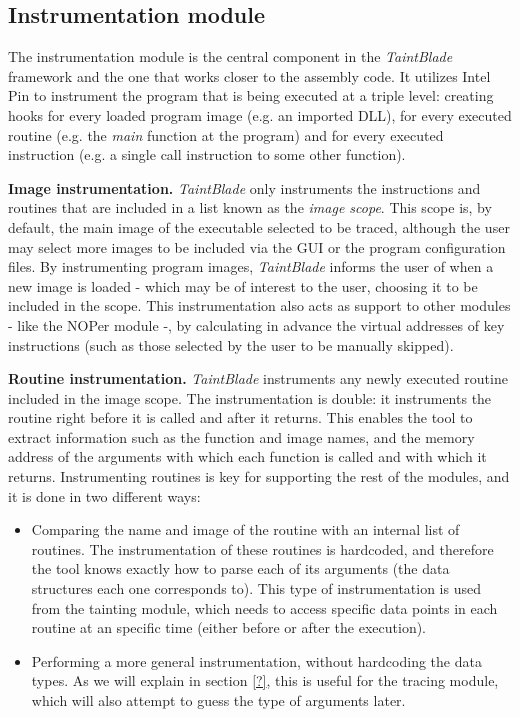 \documentclass[conference]{IEEEtran}
\begin{document}
\subsection{Instrumentation module}
The instrumentation module is the central component in the \textit{TaintBlade}
framework and the one that works closer to the assembly code. It utilizes Intel
Pin to instrument the program that is being executed at a triple level:
creating hooks for every loaded program image (e.g. an imported DLL), for every
executed routine (e.g. the \textit{main} function at the program) and for every
executed instruction (e.g. a single call instruction to some other function).

\textbf{Image instrumentation.}
\textit{TaintBlade} only instruments the instructions and routines that are included
in a list known as the \textit{image scope}. This scope is, by default, the main image of the executable
selected to be traced, although the user may select more images to be included via the GUI or
the program configuration files. By instrumenting program images, \textit{TaintBlade} informs the
user of when a new image is loaded - which may be of interest to the user, choosing it to be included
in the scope. This instrumentation also acts as support to other modules - like the NOPer module -, by calculating in
advance the virtual addresses of key instructions (such as those selected by the user to be manually skipped).

\textbf{Routine instrumentation.}
\textit{TaintBlade} instruments any newly executed routine included in the image scope. The instrumentation is double: it instruments
the routine right before it is called and after it returns. This enables
the tool to extract information such as the function and image names, and the memory address of the arguments with which each
function is called and with which it returns. Instrumenting routines is key for supporting the rest of the modules, and it is done in two different ways:

\begin{itemize}
    \item Comparing the name and image of the routine with an internal list of routines.
          The instrumentation of these routines is hardcoded, and therefore the tool
          knows exactly how to parse each of its arguments (the data structures each one
          corresponds to). This type of instrumentation is used from the tainting module,
          which needs to access specific data points in each routine at an specific time
          (either before or after the execution).
    \item Performing a more general instrumentation, without hardcoding the data types.
          As we will explain in section \ref{?}, this is useful for the tracing module,
          which will also attempt to guess the type of arguments later.
\end{itemize}
\end{document}

